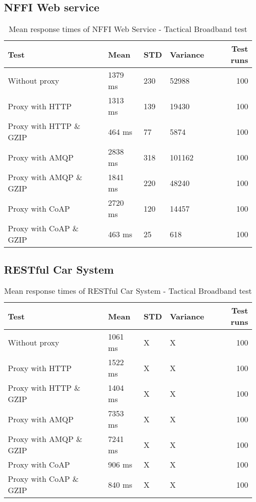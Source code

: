 \begin{appendices}
\subsection{NFFI Web service}

\begin{table}[H]
\begin{tabular}{llllr}
\hline
 Test                   &   Mean &   STD &   Variance &   Test runs \\
\hline
  Without proxy & 1379 ms & 230 & 52988 & 100 \\
  Proxy with HTTP & 1313 ms & 139 & 19430 & 100 \\
  Proxy with HTTP \& GZIP & 464 ms & 77 & 5874 & 100 \\
  Proxy with AMQP & 2838 ms & 318 & 101162 & 100 \\
  Proxy with AMQP \& GZIP & 1841 ms & 220 & 48240 & 100\\
  Proxy with CoAP & 2720 ms & 120 & 14457 & 100 \\
  Proxy with CoAP \& GZIP & 463 ms & 25 & 618 & 100 \\
\end{tabular}
\caption{Mean response times of NFFI Web Service - Tactical Broadband test}
\end{table}

\subsection{RESTful Car System}

\begin{table}[H]
\begin{tabular}{llllr}
\hline
 Test                   &   Mean &   STD  &   Variance &   Test runs \\
\hline
  Without proxy & 1061 ms & X & X & 100 \\
  Proxy with HTTP & 1522 ms & X & X & 100 \\
  Proxy with HTTP \& GZIP & 1404 ms & X & X & 100 \\
  Proxy with AMQP & 7353 ms & X & X & 100 \\
  Proxy with AMQP \& GZIP & 7241 ms & X & X & 100\\
  Proxy with CoAP & 906 ms & X & X & 100 \\
  Proxy with CoAP \& GZIP & 840 ms & X & X & 100 \\
\end{tabular}
\caption{Mean response times of RESTful Car System - Tactical Broadband test}
\end{table}



\end{appendices}
